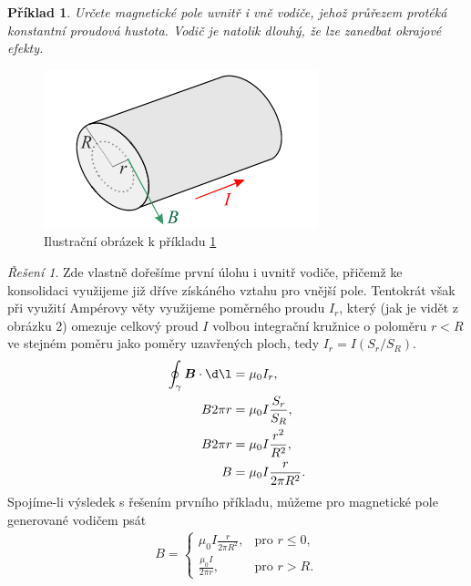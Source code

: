 \documentclass[11pt,a4paper]{report}
\renewcommand{\vec}{\boldsymbol}
\theoremstyle{theorem}
\newtheorem{example}{Příklad}
\theoremstyle{remark}
\newtheorem*{solution}{Řešení}
\theoremstyle{definition}
\begin{document}
		\begin{example}
			\label{4}
			Určete magnetické pole uvnitř i vně vodiče, jehož průřezem protéká konstantní proudová hustota. Vodič je natolik dlouhý, že lze zanedbat okrajové efekty.
		\end{example}
		\begin{figure}[h!]
			\begin{center}
				\includegraphics[width=0.5\linewidth]{img/2.png}
				\caption{Ilustrační obrázek k příkladu \ref{4}}
			\end{center}
		\end{figure}
		\begin{solution}
			Zde vlastně dořešíme první úlohu i uvnitř vodiče, přičemž ke konsolidaci využijeme již dříve získáného vztahu pro vnější pole. Tentokrát však při využití Ampérovy věty využijeme poměrného proudu $I_r$, který (jak je vidět z obrázku 2) omezuje celkový proud $I$ volbou integrační kružnice o poloměru $r<R$ ve stejném poměru jako poměry uzavřených ploch, tedy $I_r = I (S_r/S_R)$.
			\begin{align*}
				\oint_\gamma \vec B \cdot \d \vec \l &= \mu_0 I_r,
			\\
				B 2 \pi r &= \mu_0 I \frac{S_r}{S_R},
			\\
				B 2 \pi r &= \mu_0 I \frac{r^2}{R^2},
			\\
				B &= \mu_0 I \frac{r}{2 \pi R^2}.
			\end{align*}
			Spojíme-li výsledek s řešením prvního příkladu, můžeme pro magnetické pole generované vodičem psát
			\begin{align*}
				B = \left\{ \begin{matrix}
					\mu_0 I \frac{r}{2 \pi R^2}, & \text{pro } r \leq 0,
				\\[2mm]
					\frac{\mu_0 I}{2\pi r}, & \text{pro } r > R.
				\end{matrix} \right.
			\end{align*}
		\end{solution}
	
	
	
	
\end{document}
